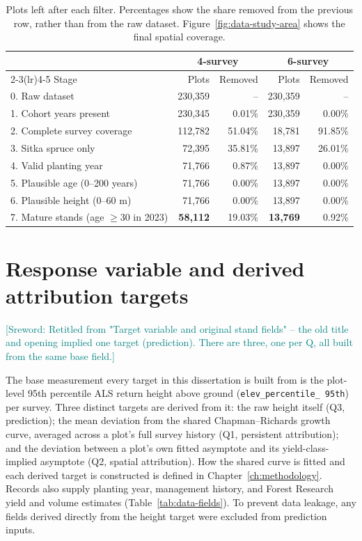\documentclass[logo,msc,ai]{infthesis}           %
\newcommand{\sr}[1]{\textcolor{teal}{[Sreword: #1]}}
\begin{document}
\begin{table}[!htbp]
\centering
\scriptsize
\begin{tabular}{lrrrr}
\toprule
& \multicolumn{2}{c}{4-survey} & \multicolumn{2}{c}{6-survey} \\
\cmidrule(lr){2-3}\cmidrule(lr){4-5}
Stage & Plots & Removed & Plots & Removed \\
\midrule
0. Raw dataset
& 230,359 & -- & 230,359 & -- \\
1. Cohort years present
& 230,345 & 0.01\% & 230,359 & 0.00\% \\
2. Complete survey coverage
& 112,782 & 51.04\% & 18,781 & 91.85\% \\
3. Sitka spruce only
& 72,395 & 35.81\% & 13,897 & 26.01\% \\
4. Valid planting year
& 71,766 & 0.87\% & 13,897 & 0.00\% \\
5. Plausible age (0--200 years)
& 71,766 & 0.00\% & 13,897 & 0.00\% \\
6. Plausible height (0--60 m)
& 71,766 & 0.00\% & 13,897 & 0.00\% \\
7. Mature stands (age $\geq 30$ in 2023)
& \textbf{58,112} & 19.03\%
& \textbf{13,769} & 0.92\% \\
\bottomrule
\end{tabular}
\caption{\small{Plots left after each filter. Percentages show the share removed from the previous row, rather than from the raw dataset. Figure~\ref{fig:data-study-area} shows the final spatial coverage.}}
\label{tab:data-cleaning-funnel}
\end{table}

\section{Response variable and derived attribution targets}
\label{sec:data-response}
\sr{Retitled from "Target variable and original stand fields" -- the old title and opening
implied one target (prediction). There are three, one per Q, all built from the same base
field.}

The base measurement every target in this dissertation is built from is the plot-level 95th
percentile ALS return height above ground (\texttt{elev\_\allowbreak percentile\_\allowbreak
95th}) per survey. Three distinct targets are derived from it: the raw height itself (Q3,
prediction); the mean deviation from the shared Chapman--Richards growth curve, averaged across
a plot's full survey history (Q1, persistent attribution); and the deviation between a plot's
own fitted asymptote and its yield-class-implied asymptote (Q2, spatial attribution). How the
shared curve is fitted and each derived target is constructed is defined in
Chapter~\ref{ch:methodology}. Records also supply planting year, management history, and Forest
Research yield and volume estimates (Table~\ref{tab:data-fields}). To prevent data leakage, any
fields derived directly from the height target were excluded from prediction inputs.
\end{document}
